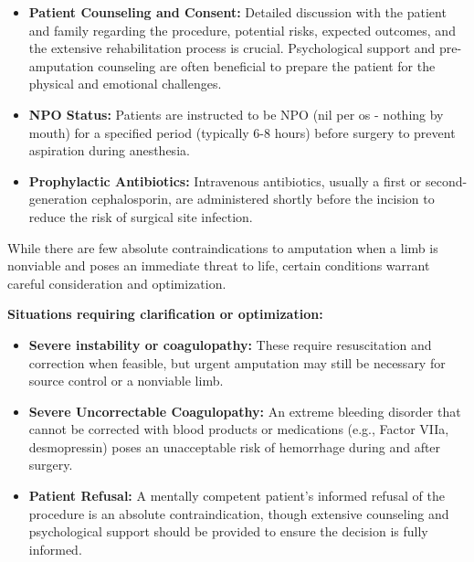 \begin{itemize}
  \item \textbf{Patient Counseling and Consent:} Detailed discussion with the patient and family regarding the procedure, potential risks, expected outcomes, and the extensive rehabilitation process is crucial. Psychological support and pre-amputation counseling are often beneficial to prepare the patient for the physical and emotional challenges.
  \item \textbf{NPO Status:} Patients are instructed to be NPO (nil per os - nothing by mouth) for a specified period (typically 6-8 hours) before surgery to prevent aspiration during anesthesia.
  \item \textbf{Prophylactic Antibiotics:} Intravenous antibiotics, usually a first or second-generation cephalosporin, are administered shortly before the incision to reduce the risk of surgical site infection.
\end{itemize}

While there are few absolute contraindications to amputation when a limb is nonviable and poses an immediate threat to life, certain conditions warrant careful consideration and optimization.

\textbf{Situations requiring clarification or optimization:}
\begin{itemize}
  \item \textbf{Severe instability or coagulopathy:} These require resuscitation and correction when feasible, but urgent amputation may still be necessary for source control or a nonviable limb.
  \item \textbf{Severe Uncorrectable Coagulopathy:} An extreme bleeding disorder that cannot be corrected with blood products or medications (e.g., Factor VIIa, desmopressin) poses an unacceptable risk of hemorrhage during and after surgery.
  \item \textbf{Patient Refusal:} A mentally competent patient's informed refusal of the procedure is an absolute contraindication, though extensive counseling and psychological support should be provided to ensure the decision is fully informed.
\end{itemize}


